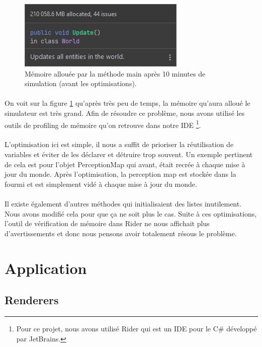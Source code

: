 \documentclass{EPUProjetDi}
\begin{document}
\begin{figure}[h]
    \centering
    \includegraphics[scale=1]{garbage_collector.png}
    \caption{Mémoire allouée par la méthode main après 10 minutes de simulation (avant les optimisations).}
    \label{fig:garbage_collector}
\end{figure}

\paragraph{}
On voit sur la figure \ref{fig:garbage_collector} qu'après très peu de temps, la mémoire qu'aura alloué le simulateur est très grand.
Afin de résoudre ce problème, nous avons utilisé les outils de profiling de mémoire qu'on retrouve dans notre IDE
\footnote{Pour ce projet, nous avons utilisé Rider qui est un IDE pour le C\# développé par JetBrains.}.
\paragraph{}
L'optimisation ici est simple, il nous a suffit de prioriser la réutilisation de variables et éviter de les déclarer et détruire trop souvent.
Un exemple pertinent de cela est pour l'objet PerceptionMap qui avant, était recrée à chaque mise à jour du monde. Après l'optimisation, la perception map est stockée dans la fourmi
et est simplement vidé à chaque mise à jour du monde. 
\paragraph{}
Il existe également d'autres méthodes qui initialisaient des listes inutilement. Nous avons modifié cela pour que ça ne soit plus le cas.
Suite à ces optimisations, l'outil de vérification de mémoire dans Rider ne nous affichait plus d'avertissements et donc nous pensons avoir totalement résous le problème.

\section{Application}

\subsection{Renderers}
\end{document}
